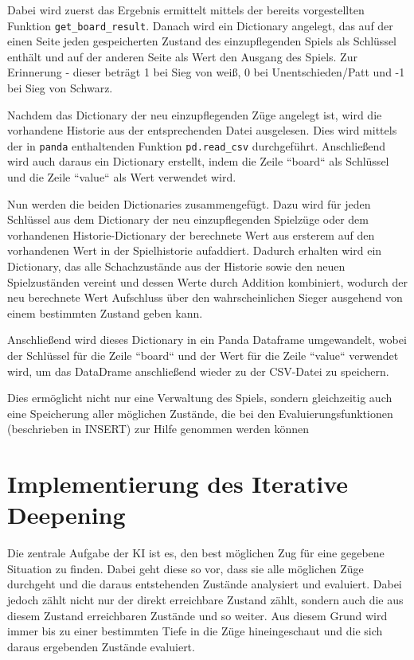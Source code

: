     Dabei wird zuerst das Ergebnis ermittelt mittels der bereits
vorgestellten Funktion \texttt{get\_board\_result}. Danach wird ein
Dictionary angelegt, das auf der einen Seite jeden gespeicherten Zustand
des einzupflegenden Spiels als Schlüssel enthält und auf der anderen
Seite als Wert den Ausgang des Spiels. Zur Erinnerung - dieser beträgt 1
bei Sieg von weiß, 0 bei Unentschieden/Patt und -1 bei Sieg von Schwarz.

Nachdem das Dictionary der neu einzupflegenden Züge angelegt ist, wird
die vorhandene Historie aus der entsprechenden Datei ausgelesen. Dies
wird mittels der in \texttt{panda} enthaltenden Funktion
\texttt{pd.read\_csv} durchgeführt. Anschließend wird auch daraus ein
Dictionary erstellt, indem die Zeile ``board`` als Schlüssel und die Zeile
``value`` als Wert verwendet wird.

Nun werden die beiden Dictionaries zusammengefügt. Dazu wird für jeden
Schlüssel aus dem Dictionary der neu einzupflegenden Spielzüge oder dem
vorhandenen Historie-Dictionary der berechnete Wert aus ersterem auf den
vorhandenen Wert in der Spielhistorie aufaddiert. Dadurch erhalten wird
ein Dictionary, das alle Schachzustände aus der Historie sowie den neuen
Spielzuständen vereint und dessen Werte durch Addition kombiniert,
wodurch der neu berechnete Wert Aufschluss über den wahrscheinlichen
Sieger ausgehend von einem bestimmten Zustand geben kann.

Anschließend wird dieses Dictionary in ein Panda Dataframe umgewandelt,
wobei der Schlüssel für die Zeile ``board`` und der Wert für die Zeile
``value`` verwendet wird, um das DataDrame anschließend wieder zu der
CSV-Datei zu speichern.

Dies ermöglicht nicht nur eine Verwaltung des Spiels, sondern
gleichzeitig auch eine Speicherung aller möglichen Zustände, die bei den
Evaluierungsfunktionen (beschrieben in INSERT) zur Hilfe genommen werden
können

    \section{Implementierung des Iterative Deepening}\label{implementierung-des-iterative-deepening}

Die zentrale Aufgabe der KI ist es, den best möglichen Zug für eine
gegebene Situation zu finden. Dabei geht diese so vor, dass sie alle
möglichen Züge durchgeht und die daraus entstehenden Zustände analysiert
und evaluiert. Dabei jedoch zählt nicht nur der direkt erreichbare
Zustand zählt, sondern auch die aus diesem Zustand erreichbaren Zustände
und so weiter. Aus diesem Grund wird immer bis zu einer bestimmten Tiefe
in die Züge hineingeschaut und die sich daraus ergebenden Zustände
evaluiert.

